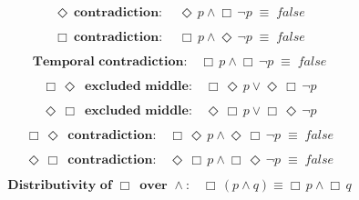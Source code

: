\documentclass[12pt, fleqn, leqno]{article}
\newcommand{\equivs}{\ensuremath{\;\equiv\;}}       %
\newcommand{\Event}{\Diamond\,}
\newcommand{\Always}{\Box\,}
\newcommand{\spacer}{\vspace{-30pt}}
\begin{document}
\spacer

\begin{equation}\label{E:contradiction}
\textbf{$\Event$ contradiction:}\quad \Event p \land \Always\neg p \equivs false
\end{equation}

\spacer

\begin{equation}\label{E:contradictionb}
\textbf{$\Always$ contradiction:}\quad \Always p \land \Event\neg p \equivs false
\end{equation}

\spacer

\begin{equation}\label{E:contradictionc}
\textbf{Temporal contradiction:}\quad \Always p \land \Always \neg p \equivs false
\end{equation}

\spacer

\begin{equation}\label{E:AEexcludedMid}
\textbf{$\Always \Event $ excluded middle:}\quad \Always \Event p \lor \Event \Always\neg p
\end{equation}

\spacer

\begin{equation}\label{E:EAexcludedMid}
\textbf{$\Event \Always $ excluded middle:}\quad \Event \Always p \lor \Always \Event\neg p
\end{equation}

\spacer

\begin{equation}\label{E:AEcontradiction}
\textbf{$\Always \Event$ contradiction:}\quad \Always \Event p \land \Event \Always\neg p \equivs false
\end{equation}

\spacer

\begin{equation}\label{E:EAcontradiction}
\textbf{$\Event \Always$ contradiction:}\quad \Event \Always p \land  \Always \Event\neg p \equivs false
\end{equation}

\spacer

\begin{equation}\label{E:distAlwaysAnd}
\textbf{Distributivity of $\Always$ over $\land$:}\quad \Always (p \land q) \equiv \Always p \land \Always q
\end{equation}
\end{document}
